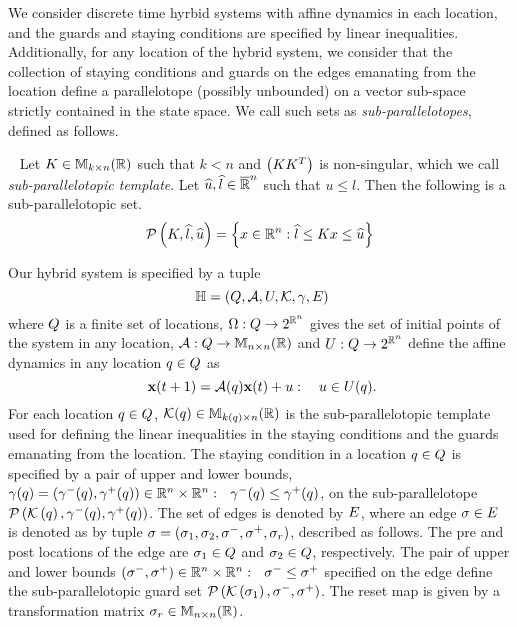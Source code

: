 We consider discrete time hyrbid systems with affine dynamics in each
location, and the guards and staying conditions are specified by
linear inequalities.  Additionally, for any location of the hybrid
system, we consider that the collection of staying conditions and
guards on the edges emanating from the location define a parallelotope
(possibly unbounded) on a vector sub-space strictly contained in the
state space.  We call such sets as \emph{sub-parallelotopes}, defined
as follows.
%
\begin{definition}~\label{defn:sub-parallelotope} Let
  $K\in\mathbb{M}_{k\times n}(\mathbb{R})$ such that $k<n$ and $\left(KK^T\right)$ is
  non-singular, which we call \emph{sub-parallelotopic template}.  Let
  $\widehat{u},\widehat{l}\in\mathbb{\overline{R}}^n$ such that $u\leq l$.  Then the following
  is a sub-parallelotopic set.
\[
\mathcal{P}\left(K,\widehat{l},\widehat{u}\right) = \left\{x\in\mathbb{R}^n: \widehat{l}\leq Kx \leq \widehat{u}\right\}
\]
\end{definition}

Our hybrid system is specified by a tuple 
\begin{equation}~\label{eqn:system}
\mathbb{H} =
\left(Q,\mathcal{A},U,\mathcal{K},\gamma,E\right)
\end{equation}
where $Q$ is a finite set of locations,
$\Omega:Q\rightarrow 2^{\mathbb{R}^n}$ gives the set of initial points
of the system in any location,
$\mathcal{A}:Q\rightarrow\mathbb{M}_{n\times n}(\mathbb{R})$ and
$U:Q\rightarrow 2^{\mathbb{R}^n}$ define the affine dynamics in any
location $q\in Q$ as 
\begin{equation}~\label{eqn:next}
{\bf x}(t+1) = \mathcal{A}(q){\bf x}(t)+u:~~~u\in U(q).
\end{equation}
For each location $q\in Q$,
$\mathcal{K}(q)\in\mathbb{M}_{k(q)\times n}(\mathbb{\mathbb{R}})$ is the sub-parallelotopic
template used for defining the linear inequalities in the staying
conditions and the guards emanating from the location.  The staying
condition in a location $q\in Q$ is specified by a pair
of upper and lower bounds,
$\gamma(q)=\left(\gamma^-(q),\gamma^+(q)\right)\in\mathbb{R}^n\times\mathbb{R}^n:
~~\gamma^-(q)\leq\gamma^+(q)$, on the sub-parallelotope
$\mathcal{P}\left(\mathcal{K}\left(q\right),\gamma^-(q),\gamma^+(q)\right)$.  The
set of edges is denoted by $E$, where an edge
$\sigma\in E$ is denoted as by tuple $\sigma =
\left(\sigma_{1},\sigma_{2},\sigma^-,\sigma^+,\sigma_r\right)$, described as
follows.  The pre and post locations of the edge are
$\sigma_{1}\in Q$ and $\sigma_{2}\in Q$,
respectively.  The pair of upper and lower bounds
$\left(\sigma^-,\sigma^+\right)\in\mathbb{R}^n\times\mathbb{R}^n:~~\sigma^-\leq\sigma^+$
specified on the edge define the sub-parallelotopic guard set
$\mathcal{P}\left(\mathcal{K}\left(\sigma_{1}\right),\sigma^-,\sigma^+\right)$.  The
reset map is given by a transformation matrix
$\sigma_r\in\mathbb{M}_{n\times n}(\mathbb{R})$.

